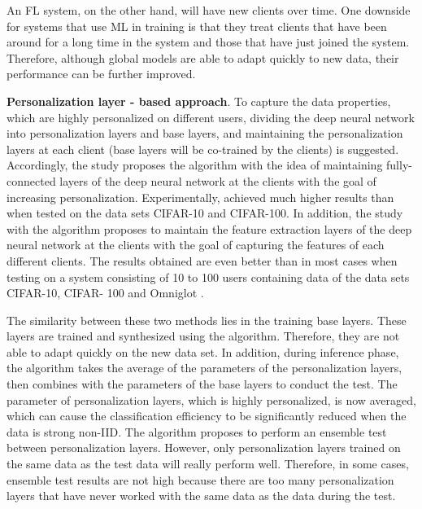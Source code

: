 \documentclass[runningheads]{llncs}
\begin{document}
An FL system, on the other hand, will have new clients over time. One downside for systems that use ML in training is that they treat clients that have been around for a long time in the system and those that have just joined the system. Therefore, although global models are able to adapt quickly to new data, their performance can be further improved.

\textbf{Personalization layer - based approach}. To capture the data properties, which are highly personalized on different users, dividing the deep neural network into personalization layers and base layers, and maintaining the personalization layers at each client (base layers will be co-trained by the clients) is suggested. Accordingly, the study \cite{arivazhagan2019federated} proposes the  algorithm with the idea of maintaining fully-connected layers of the deep neural network at the clients with the goal of increasing personalization. Experimentally,  achieved much higher results than  when tested on the data sets CIFAR-10 and CIFAR-100. In addition, the study \cite{liang2020think} with the algorithm  proposes to maintain the feature extraction layers of the deep neural network at the clients with the goal of capturing the features of each different clients. The results obtained are even better than  in most cases when testing on a system consisting of 10 to 100 users containing data of the data sets CIFAR-10, CIFAR- 100 and Omniglot \cite{lake2015human}.

The similarity between these two methods lies in the training base layers. These layers are trained and synthesized using the  algorithm. Therefore, they are not able to adapt quickly on the new data set. In addition, during inference phase, the  algorithm takes the average of the parameters of the personalization layers, then combines with the parameters of the base layers to conduct the test. The parameter of personalization layers, which is highly personalized, is now averaged, which can cause the classification efficiency to be significantly reduced when the data is strong non-IID. The algorithm  proposes to perform an ensemble test between personalization layers. However, only personalization layers trained on the same data as the test data will really perform well. Therefore, in some cases, ensemble test results are not high because there are too many personalization layers that have never worked with the same data as the data during the test.
\end{document}
